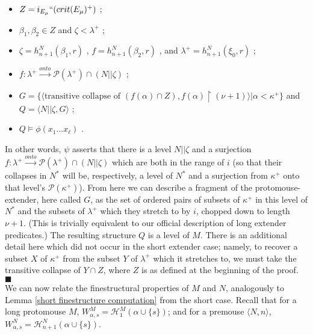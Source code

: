 \documentclass[12pt]{article}
\begin{document}
\begin{itemize}

\item{$Z = i_{E_\mu}``( crit (E_\mu)^+ )$ ;}
\item{$\beta_1 , \beta_2 \in Z$ and $\zeta < \lambda^+$ ;}
\item{$\zeta = h_{n+1}^N ( \beta_1 , r )$ , $f = h_{n+1}^N ( \beta_2 , r )$ , and $\lambda^+ = h_{n+1}^N ( \xi_0 , r )$ ;}
\item{$f : \lambda^+ \xrightarrow{onto} \mathcal{P} (\lambda^+ ) \cap (N || \zeta)$ ; }
\item{$G = \{ \langle \text{transitive collapse of }(f ( \alpha ) \cap Z ) , f (\alpha ) \restriction (\nu + 1) \rangle | \alpha < \kappa^+ \}$ and $Q = \langle N || \zeta , G \rangle$ ;}
\item{$Q \models \phi (x_1 ... x_\ell )$ . }
 

\end{itemize}

In other words, $\psi$ asserts that there is a level $N || \zeta$ and a surjection $f : \lambda^+  \xrightarrow{onto} \mathcal{P} (\lambda^+ ) \cap (N || \zeta)$ which are both in the range of $i$ (so that their collapses in $N^*$ will be, respectively, a level of $N^*$ and a surjection from $\kappa^+$ onto that level's $\mathcal{P} (\kappa^+ )$).  From here we can describe a fragment of the protomouse-extender, here called $G$, as the set of ordered pairs of subsets of $\kappa^+$ in this level of $N^*$ and the subsets of $\lambda^+$ which they stretch to by $i$, chopped down to length $\nu + 1$.  (This is trivially equivalent to our official description of long extender predicates.)  The resulting structure $Q$ is a level of $M$.  There is an additional detail here which did not occur in the short extender case; namely, to recover a subset $X$ of $\kappa^+$ from the subset $Y$ of $\lambda^+$ which it stretches to, we must take the transitive collapse of $Y \cap Z$, where $Z$ is as defined at the beginning of the proof. $\blacksquare$\\


We can now relate the finestructural properties of $M$ and $N$, analogously to Lemma \ref{short finestructure computation} from the short case.  Recall that for a long protomouse $M$, $W_{\alpha , s}^M = \mathcal{H}_{1}^M (\alpha \cup \{ s \} )$; and for a premouse $\langle N , n \rangle $, $W_{\alpha , s}^N = \mathcal{H}_{n+1}^N ( \alpha \cup \{ s \} ) $.\\
\end{document}
